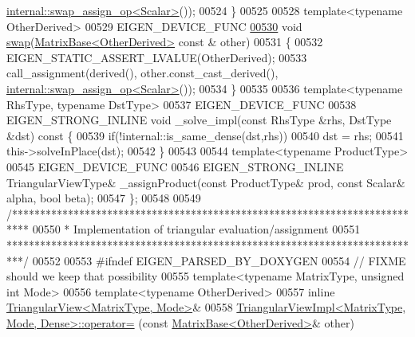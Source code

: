 \begin{DoxyCode}
      \hyperlink{struct_eigen_1_1internal_1_1swap__assign__op}{internal::swap\_assign\_op<Scalar>}());
00524     \}
00525 
00528     \textcolor{keyword}{template}<\textcolor{keyword}{typename} OtherDerived>
00529     EIGEN\_DEVICE\_FUNC
\hyperlink{group___core___module_a4723aa22f7e47d8d125079fe4f40f950}{00530}     \textcolor{keywordtype}{void} \hyperlink{group___core___module_a4723aa22f7e47d8d125079fe4f40f950}{swap}(\hyperlink{group___core___module_class_eigen_1_1_matrix_base}{MatrixBase<OtherDerived>} \textcolor{keyword}{const} & other)
00531     \{
00532       EIGEN\_STATIC\_ASSERT\_LVALUE(OtherDerived);
00533       call\_assignment(derived(), other.const\_cast\_derived(), 
      \hyperlink{struct_eigen_1_1internal_1_1swap__assign__op}{internal::swap\_assign\_op<Scalar>}());
00534     \}
00535 
00536     \textcolor{keyword}{template}<\textcolor{keyword}{typename} RhsType, \textcolor{keyword}{typename} DstType>
00537     EIGEN\_DEVICE\_FUNC
00538     EIGEN\_STRONG\_INLINE \textcolor{keywordtype}{void} \_solve\_impl(\textcolor{keyword}{const} RhsType &rhs, DstType &dst)\textcolor{keyword}{ const }\{
00539       \textcolor{keywordflow}{if}(!internal::is\_same\_dense(dst,rhs))
00540         dst = rhs;
00541       this->solveInPlace(dst);
00542     \}
00543 
00544     \textcolor{keyword}{template}<\textcolor{keyword}{typename} ProductType>
00545     EIGEN\_DEVICE\_FUNC
00546     EIGEN\_STRONG\_INLINE TriangularViewType& \_assignProduct(\textcolor{keyword}{const} ProductType& prod, \textcolor{keyword}{const} Scalar& alpha, \textcolor{keywordtype}{
      bool} beta);
00547 \};
00548 
00549 \textcolor{comment}{/***************************************************************************}
00550 \textcolor{comment}{* Implementation of triangular evaluation/assignment}
00551 \textcolor{comment}{***************************************************************************/}
00552 
00553 \textcolor{preprocessor}{#ifndef EIGEN\_PARSED\_BY\_DOXYGEN}
00554 \textcolor{comment}{// FIXME should we keep that possibility}
00555 \textcolor{keyword}{template}<\textcolor{keyword}{typename} MatrixType, \textcolor{keywordtype}{unsigned} \textcolor{keywordtype}{int} Mode>
00556 \textcolor{keyword}{template}<\textcolor{keyword}{typename} OtherDerived>
00557 \textcolor{keyword}{inline} \hyperlink{group___core___module_class_eigen_1_1_triangular_view}{TriangularView<MatrixType, Mode>}&
00558 \hyperlink{class_eigen_1_1_triangular_view_impl}{TriangularViewImpl<MatrixType, Mode, Dense>::operator=}
      (\textcolor{keyword}{const} \hyperlink{group___core___module_class_eigen_1_1_matrix_base}{MatrixBase<OtherDerived>}& other)

\end{DoxyCode}

